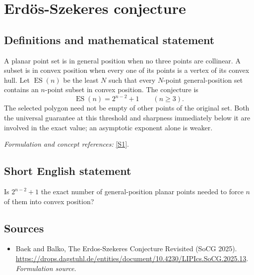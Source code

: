 \documentclass[11pt]{article}
\begin{document}
\section*{\texorpdfstring{Erdös-Szekeres conjecture}{Erdös-Szekeres conjecture}}\label{3080}
\subsection{Definitions and mathematical statement}
A planar point set is in general position when no three points are collinear. A subset is in convex position when every one of its points is a vertex of its convex hull. Let $\operatorname{ES}(n)$ be the least $N$ such that every $N$-point general-position set contains an $n$-point subset in convex position. The conjecture is
\[
 \operatorname{ES}(n)=2^{n-2}+1\qquad(n\ge3).
\]
The selected polygon need not be empty of other points of the original set. Both the universal guarantee at this threshold and sharpness immediately below it are involved in the exact value; an asymptotic exponent alone is weaker.
\par\smallskip\textit{Formulation and concept references:} \href{https://drops.dagstuhl.de/entities/document/10.4230/LIPIcs.SoCG.2025.13}{[S1]}.

\subsection{Short English statement}
Is $2^{n-2}+1$ the exact number of general-position planar points needed to force $n$ of them into convex position?
\subsection{Sources}
\begin{itemize}
\item[S1]Baek and Balko, The Erdos-Szekeres Conjecture Revisited (SoCG 2025).
\url{https://drops.dagstuhl.de/entities/document/10.4230/LIPIcs.SoCG.2025.13}.
\textit{Formulation source.}
\end{itemize}
\end{document}
